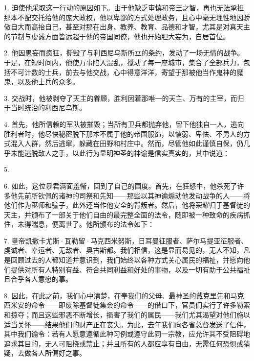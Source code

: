 1. 迫使他采取这一行动的原因如下。由于他缺乏审慎和帝王之智，再也无法承担那本不配交托给他的庞大政权，他以卑鄙的方式处理政务，且心中毫无理性地因骄傲自大而高抬自己，甚至对那在出身、教养、教育、品德和才智，尤其是对真天主的节制与虔诚方面皆远超于他的帝国同僚，他也开始胆大妄为，自居首位。\par

2. 他因愚妄而疯狂，撕毁了与利西尼乌斯所立的条约，发动了一场无情的战争。于是，在短时间内，他使万事陷入混乱，搅动了每一座城市，集合了全部兵力，包括不可计数的士兵，前去与他交战，心中得意洋洋，寄望于那被他当作鬼神的魔鬼，以及他士兵的众多。\par

3. 交战时，他被剥夺了天主的眷顾，胜利因着那唯一的天主、万有的主宰，而归于当时统治的利西尼乌斯。\par

4. 首先，他所信赖的军队被摧毁；当所有卫兵都抛弃他，留下他独自一人，逃向胜利者时，他尽快秘密脱下那本不属于他的帝国服饰，以懦弱、卑怯、不男人的方式混入人群，然后逃窜，躲藏在田野和村庄中。然而，尽管他如此谨慎自保，仍几乎未能逃脱敌人之手，以此行为显明神圣的神谕是信实真实的，其中说道： \par

5.  \par

6. 如此，这位暴君满面羞惭，回到了自己的国度。首先，在狂怒中，他杀死了许多他先前所钦佩的诸神的司祭和先知——那些以其神谕煽动他发动战争的人——将他们作为巫师和骗子，此外还当作他安全的背叛者。然后，他将荣耀归于基督徒的天主，并颁布了一部关于他们自由的最完整全面的法令，随即被一种致命的疾病抓住，未得喘息，便离世了。他所颁布的法令如下：\par

\par

7. 皇帝凯撒卡尤斯·瓦勒留·马克西米努斯，日耳曼征服者、萨尔马提亚征服者、虔诚者、幸运者、无敌者、奥古斯都。我们相信，这是显而易见的，无人不知，凡是回顾过去的人都知道并意识到，我们始终以各种方式关心属民的福祉，并愿向他们提供对所有人特别有益、符合共同利益和好处的事物，以及一切有助于公共福祉且合乎各人意愿的事。\par

8. 因此，在此之前，我们心中清楚，在奉我们的父母、最神圣的戴克里先和马克西米安的命令——即废除基督徒集会的命令——的借口下，官员们实行了许多勒索和掠夺；而且这些邪恶不断增长，损害了我们的属民——我们尤其渴望对他们施以适当关怀——结果他们的财产正在丧失。为此，去年我们向各省总督发送了信件，其中我们谕令：若有人愿意遵循此种习例或遵守此同一宗教，应允许其不受阻碍地追求其目的，无人可阻挠或禁止；并且所有的人都应享有自由，无需任何恐惧或猜疑，去做各人所偏好之事。\par

